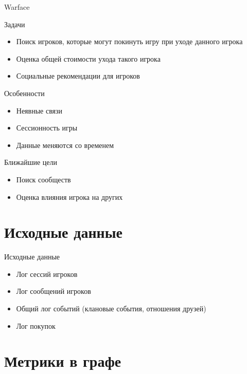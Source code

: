\documentclass[10pt]{beamer}
\begin{document}
\begin{frame}{Warface}

\begin{block}{Задачи}
\begin{itemize}
\item Поиск игроков, которые могут покинуть игру при уходе данного игрока
\item Оценка общей стоимости ухода такого игрока
\item Социальные рекомендации для игроков
\end{itemize}
\end{block}

\begin{block}{Особенности}
\begin{itemize}
\item Неявные связи
\item Сессионность игры
\item Данные меняются со временем
\end{itemize}
\end{block}

\begin{block}{Ближайшие цели}
\begin{itemize}
\item Поиск сообществ
\item Оценка влияния игрока на других
\end{itemize}
\end{block}

\end{frame}

\section{Исходные данные}


\begin{frame}{Исходные данные}

\begin{itemize}
\item Лог сессий игроков
\item Лог сообщений игроков
\item Общий лог событий (клановые события, отношения друзей)
\item Лог покупок
\end{itemize}


\end{frame}

\section{Метрики в графе}
\end{document}
